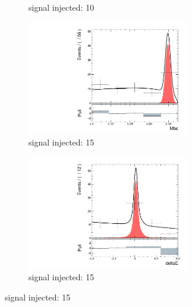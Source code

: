 \begin{figure}[H]
\begin{subfigure}{0.5\linewidth}
		\caption{signal injected: 10}
	\end{subfigure}
	\begin{subfigure}{0.5\linewidth}
		\includegraphics[page=1,height=5cm]{figures/injection_sig_15/ds_gen_Mbc_2D.pdf}
		\caption{signal injected: 15}
	\end{subfigure}
	\begin{subfigure}{0.5\linewidth}
		\includegraphics[page=1,height=5cm]{figures/injection_sig_15/ds_gen_deltaE_2D.pdf}
		\caption{signal injected: 15}
	\end{subfigure}
\end{figure}

